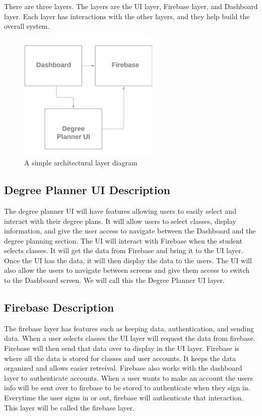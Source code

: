 There are three layers. The layers are the UI layer, Firebase layer, and Dashboard layer. Each layer has interactions with the other layers, and they help build the overall system. 
\begin{figure}[h!]
	\centering
 	\includegraphics[width=0.60\textwidth]{images/system_overview_pic}
 \caption{A simple architectural layer diagram}
\end{figure}

\subsection{Degree Planner UI Description}
    The degree planner UI will have features allowing users to easily select and interact with their degree plans. It will allow users to select classes, display information, and give the user access to navigate between the Dashboard and the degree planning section. The UI will interact with Firebase when the student selects classes. It will get the data from Firebase and bring it to the UI layer. Once the UI has the data, it will then display the data to the users. The UI will also allow the users to navigate between screens and give them access to switch to the Dashboard screen. We will call this the Degree Planner UI layer.

\subsection{Firebase Description}
    The firebase layer has features such as keeping data, authentication, and sending data. When a user selects classes the UI layer will request the data from firebase. Firebase will then send that data over to display in the UI layer. Firebase is where all the data is stored for classes and user accounts. It keeps the data organized and allows easier retreival. Firebase also works with the dashboard layer to authenticate accounts. When a user wants to make an account the users info will be sent over to firebase to be stored to authenticate when they sign in. Everytime the user signs in or out, firebase will authenticate that interaction. This layer will be called the firebase layer. 


